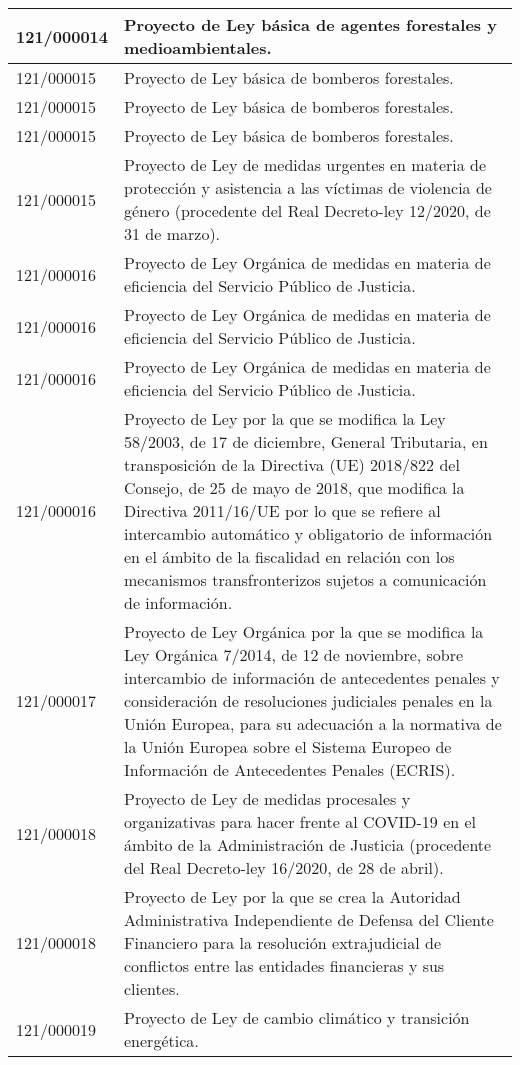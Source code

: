 {\begin{table}[H]
\begin{center}
\begin{tabularx}{\linewidth}{| l | X |}
\hline
121/000014 & Proyecto de Ley básica de agentes forestales y medioambientales. \\
\hline
121/000015 & Proyecto de Ley básica de bomberos forestales. \\
\hline
121/000015 & Proyecto de Ley básica de bomberos forestales. \\
\hline
121/000015 & Proyecto de Ley básica de bomberos forestales. \\
\hline
121/000015 & Proyecto de Ley de medidas urgentes en materia de protección y asistencia a las víctimas de violencia de género (procedente del Real Decreto-ley 12/2020, de 31 de marzo). \\
\hline
121/000016 & Proyecto de Ley Orgánica de medidas en materia de eficiencia del Servicio Público de Justicia. \\
\hline
121/000016 & Proyecto de Ley Orgánica de medidas en materia de eficiencia del Servicio Público de Justicia. \\
\hline
121/000016 & Proyecto de Ley Orgánica de medidas en materia de eficiencia del Servicio Público de Justicia. \\
\hline
121/000016 & Proyecto de Ley por la que se modifica la Ley 58/2003, de 17 de diciembre, General Tributaria, en transposición de la Directiva (UE) 2018/822 del Consejo, de 25 de mayo de 2018, que modifica la Directiva 2011/16/UE por lo que se refiere al intercambio automático y obligatorio de información en el ámbito de la fiscalidad en relación con los mecanismos transfronterizos sujetos a comunicación de información. \\
\hline
121/000017 & Proyecto de Ley Orgánica por la que se modifica la Ley Orgánica 7/2014, de 12 de noviembre, sobre intercambio de información de antecedentes penales y consideración de resoluciones judiciales penales en la Unión Europea, para su adecuación a la normativa de la Unión Europea sobre el Sistema Europeo de Información de Antecedentes Penales (ECRIS). \\
\hline
121/000018 & Proyecto de Ley de medidas procesales y organizativas para hacer frente al COVID-19 en el ámbito de la Administración de Justicia (procedente del Real Decreto-ley 16/2020, de 28 de abril). \\
\hline
121/000018 & Proyecto de Ley por la que se crea la Autoridad Administrativa Independiente de Defensa del Cliente Financiero para la resolución extrajudicial de conflictos entre las entidades financieras y sus clientes. \\
\hline
121/000019 & Proyecto de Ley de cambio climático y transición energética. \\

\end{tabularx}
\end{center}
\end{table}}
